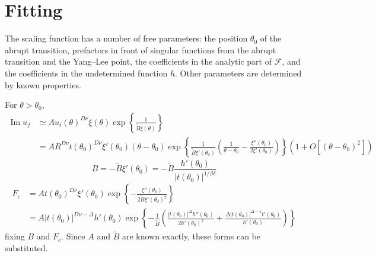 \documentclass[
  aps,
  pre,
  preprint,
  longbibliography,
  floatfix
]{revtex4-2}
\begin{document}
\section{Fitting}

The scaling function has a number of free parameters: the position $\theta_0$ of the abrupt transition, prefactors in front of singular functions from the abrupt transition and the Yang--Lee point, the coefficients in the analytic part of $\mathcal F$, and the coefficients in the undetermined function $h$. Other parameters are determined by known properties.

For $\theta>\theta_0$,
\begin{equation}
  \begin{aligned}
    \operatorname{Im}u_f
    &\simeq A u_t(\theta)^{D\nu}\xi(\theta)\exp\left\{\frac1{\tilde B\xi(\theta)}\right\} \\
    &=AR^{D\nu}t(\theta_0)^{D\nu}\xi'(\theta_0)(\theta-\theta_0)
    \exp\left\{\frac1{\tilde B\xi'(\theta_0)}\left(\frac1{\theta-\theta_0}
      -\frac{\xi''(\theta_0)}{2\xi'(\theta_0)}\right)
      \right\}\left(1+O[(\theta-\theta_0)^2]\right)
  \end{aligned}
\end{equation}
\begin{equation}
  B=-\tilde B\xi'(\theta_0)=-\tilde B\frac{h'(\theta_0)}{|t(\theta_0)|^{1/\beta\delta}}
\end{equation}
\begin{equation}
  \begin{aligned}
    F_c&=At(\theta_0)^{D\nu}\xi'(\theta_0)\exp\left\{
    -\frac{\xi''(\theta_0)}{2\tilde B\xi'(\theta_0)^2}
  \right\} \\
       &=
       A|t(\theta_0)|^{D\nu-\Delta}h'(\theta_0)
       \exp\left\{-\frac1{\tilde B}\left(\frac{|t(\theta_0)|^\Delta h''(\theta_0)}{2h'(\theta_0)^2}+\frac{\Delta|t(\theta_0)|^{\Delta - 1} t'(\theta_0)}{h'(\theta_0)}
       \right)\right\} 
  \end{aligned}
\end{equation}
fixing $B$ and $F_c$. Since $A$ and $\tilde B$ are known exactly, these forms can be substituted.
\end{document}
